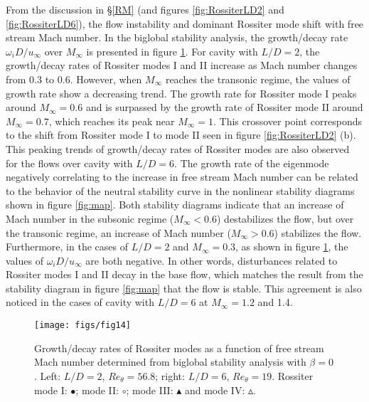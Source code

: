 \documentclass{jfm}
\begin{document}
From the discussion in \S \ref{RM} (and figures \ref{fig:RossiterLD2} and \ref{fig:RossiterLD6}), the flow instability and dominant Rossiter mode shift with free stream Mach number. In the biglobal stability analysis, the growth/decay rate $\omega_i D/u_\infty$ over $M_\infty$ is presented in figure \ref{fig:beta0_growth}. For cavity with $L/D=2$, the growth/decay rates of Rossiter modes I and II increase as Mach number changes from 0.3 to 0.6. However, when $M_\infty$ reaches the transonic regime, the values of growth rate show a decreasing trend. The growth rate for Rossiter mode I peaks around $M_\infty=0.6$ and is surpassed by the growth rate of Rossiter mode II around $M_\infty=0.7$, which reaches its peak near $M_\infty=1$. This crossover point corresponds to the shift from Rossiter mode I to mode II seen in figure \ref{fig:RossiterLD2} (b). This peaking trends of growth/decay rates of Rossiter modes are also observed for the flows over cavity with $L/D=6$. The growth rate of the eigenmode negatively correlating to the increase in free stream Mach number can be related to the behavior of the neutral stability curve in the nonlinear stability diagrams shown in figure \ref{fig:map}. Both stability diagrams indicate that an increase of Mach number in the subsonic regime ($M_\infty<0.6$) destabilizes the flow, but over the transonic regime, an increase of Mach number ($M_\infty>0.6$) stabilizes the flow. Furthermore, in the cases of $L/D=2$ and $M_\infty=0.3$, as shown in figure \ref{fig:beta0_growth}, the values of $\omega_i D/u_\infty$ are both negative. In other words, disturbances related to Rossiter modes I and II decay in the base flow, which matches the result from the stability diagram in figure \ref{fig:map} that the flow is stable. This agreement is also noticed in the cases of cavity with $L/D=6$ at $M_\infty=1.2$ and 1.4.     
\begin{figure}
\begin{center}
\texttt{[image: figs/fig14]}
   \caption{Growth/decay rates of Rossiter modes as a function of free stream Mach number determined from biglobal stability analysis with $\beta=0$. Left: $L/D=2$, $Re_\theta=56.8$; right: $L/D=6$, $Re_\theta=19$. Rossiter mode I: $\bullet$; mode II: $\circ$; mode III: $\blacktriangle$ and mode IV: $\vartriangle$.} 
      \label{fig:beta0_growth} 
\end{center}
\end{figure}
\end{document}
